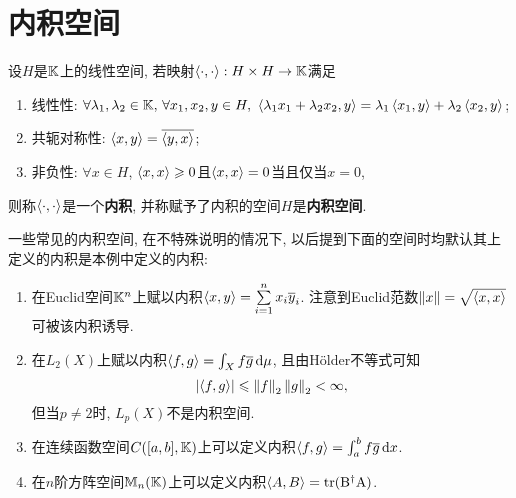 \section{内积空间}
	
	\begin{Definition}[内积空间]
	设$ H $是$ \mathbb{K} $上的线性空间, 若映射$ \left\langle \cdot,\cdot \right\rangle : H\times H\to\mathbb{K} $满足
	\begin{enumerate}[(1)]
	\item 线性性: $ \forall \lambda_1,\lambda_2\in\K,\,\forall x_1,x_2,y\in H,\ \lrangle{\lambda_1x_1+\lambda_2x_2,y}=\lambda_1\lrangle{x_1,y}+\lambda_2\lrangle{x_2,y} $;
	\item 共轭对称性: $ \left\langle x,y \right\rangle=\overline{\left\langle y,x \right\rangle} $;
	\item 非负性: $ \forall x\in H $, $ \left\langle x,x \right\rangle\geqslant 0 $且$ \left\langle x,x \right\rangle=0 $当且仅当$ x=0 $,
	\end{enumerate}
	则称$ \left\langle \cdot,\cdot \right\rangle $是一个\textbf{内积}, 并称赋予了内积的空间$ H $是\textbf{内积空间}.
	\end{Definition}
	
	\begin{Example}
	一些常见的内积空间, 在不特殊说明的情况下, 以后提到下面的空间时均默认其上定义的内积是本例中定义的内积:
	\begin{enumerate}[(1)]
	\item 在Euclid空间$ \mathbb{K}^n $上赋以内积$ \left\langle x,y \right\rangle=\sum\limits_{i=1}^nx_i\overline{y}_i $. 注意到Euclid范数$ \left\| x \right\|=\sqrt{\left\langle x,x \right\rangle} $可被该内积诱导.
	\item 在$ L_2(X) $上赋以内积$ \left\langle f,g \right\rangle=\int_Xf\overline{g}\,\mathrm{d}\mu $, 且由H\"older不等式可知
	\[
	\left| \left\langle f,g \right\rangle \right| \leqslant\left\| f \right\|_2\left\| g \right\|_2<\infty,
	\]
	但当$ p\ne 2 $时, $ L_p(X) $不是内积空间.
	\item 在连续函数空间$ C([a,b],\mathbb{K}) $上可以定义内积$ \left\langle f,g \right\rangle=\int_a^bf\overline{g}\,\mathrm{d} x $.
	\item 在$ n $阶方阵空间$ \mathbb{M}_n(\mathbb{K}) $上可以定义内积$ \left\langle A,B \right\rangle=\mathrm{tr(B^\dagger A)} $.
	\end{enumerate}
	\end{Example}
	
